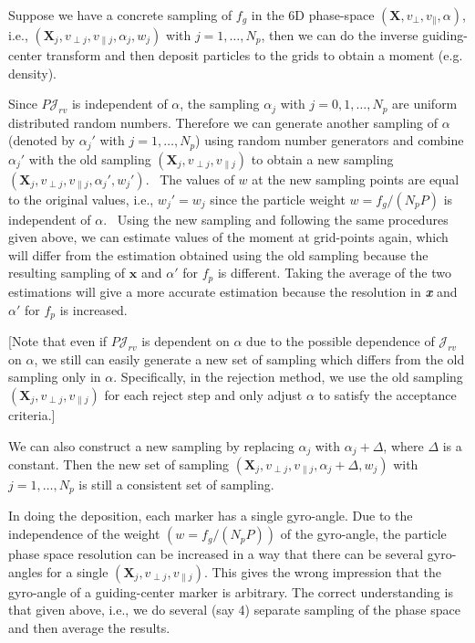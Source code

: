 \documentclass{article}
\newcommand{\tmem}[1]{{\em #1\/}}
\newcommand{\tmstrong}[1]{\textbf{#1}}
\begin{document}
Suppose we have a concrete sampling of $f_g$ in the 6D phase-space
$(\mathbf{X}, v_{\perp}, v_{\parallel}, \alpha)$, i.e., $(\mathbf{X}_j,
v_{\perp j}, v_{\parallel j}, \alpha_j, w_j)$ with $j = 1, \ldots, N_p$, then
we can do the inverse guiding-center transform and then deposit particles to
the grids to obtain a moment (e.g. density).

Since $P \mathcal{J}_{r v}$ is independent of $\alpha$, the sampling
$\alpha_j$ with $j = 0, 1, \ldots, N_p$ are uniform distributed random
numbers. Therefore we can generate another sampling of $\alpha$ (denoted by
$\alpha_j'$ with $j = 1, \ldots, N_p$) using random number generators and
combine $\alpha_j'$ with the old sampling $(\mathbf{X}_j, v_{\perp j},
v_{\parallel j})$ to obtain a new sampling $(\mathbf{X}_j, v_{\perp j},
v_{\parallel j}, \alpha_j', w_j')$. \ The values of $w$ at the new sampling
points are equal to the original values, i.e., $w_j' = w_j$ since the particle
weight $w = f_g / (N_p P)$ is independent of $\alpha$. \ Using the new
sampling and following the same procedures given above, we can estimate values
of the moment at grid-points again, which will differ from the estimation
obtained using the old sampling because the resulting sampling of $\mathbf{x}$
and $\alpha'$ for $f_p$ is different. Taking the average of the two
estimations will give a more accurate estimation because the resolution in
{\tmstrong{{\tmem{x}}}} and $\alpha'$ for $f_p$ is increased.

[Note that even if $P \mathcal{J}_{r v}$ is dependent on $\alpha$ due to the
possible dependence of $\mathcal{J}_{r v}$ on $\alpha$, we still can easily
generate a new set of sampling which differs from the old sampling only in
$\alpha$. Specifically, in the rejection method, we use the old sampling
$(\mathbf{X}_j, v_{\perp j}, v_{\parallel j})$ for each reject step and only
adjust $\alpha$ to satisfy the acceptance criteria.]

We can also construct a new sampling by replacing $\alpha_j$ with $\alpha_j +
\Delta$, where $\Delta$ is a constant. Then the new set of sampling
$(\mathbf{X}_j, v_{\perp j}, v_{\parallel j}, \alpha_j + \Delta, w_j)$ with $j
= 1, \ldots, N_p$ is still a consistent set of sampling.

In doing the deposition, each marker has a single gyro-angle. Due to the
independence of the weight $(w = f_g / (N_p P))$ of the gyro-angle, the
particle phase space resolution can be increased in a way that there can be
several gyro-angles for a single $(\mathbf{X}_j, v_{\perp j}, v_{\parallel
j})$. This gives the wrong impression that the gyro-angle of a guiding-center
marker is arbitrary. The correct understanding is that given above, i.e., we
do several (say 4) separate sampling of the phase space and then average the
results.
\end{document}
